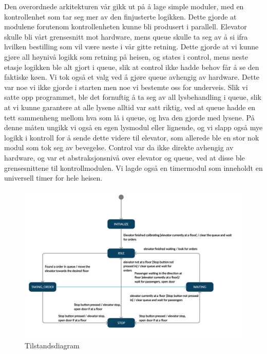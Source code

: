 \documentclass{article}
\begin{document}
Den overordnede arkitekturen vår gikk ut på å lage simple moduler, med en kontrollenhet som tar seg mer av den finjusterte logikken. Dette gjorde at modulene forutenom kontrollenheten kunne bli produsert i parallell. Elevator skulle bli vårt grensesnitt mot hardware, mens queue skulle ta seg av å si ifra hvilken bestilling som vil være neste i vår gitte retning. Dette gjorde at vi kunne gjøre all høynivå logikk som retning på heisen, og states i control, mens neste etasje logikken ble alt gjort i queue, slik at control ikke hadde behov får å se den faktiske køen. Vi tok også et valg ved å gjøre queue avhengig av hardware. Dette var noe vi ikke gjorde i starten men noe vi bestemte oss for underveis. Slik vi satte opp programmet, ble det fornuftig å ta seg av all lysbehandling i queue, slik at vi kunne garantere at alle lysene alltid var satt riktig, ved at queue hadde en tett sammenheng mellom hva som lå i queue, og hva den gjorde med lysene. På denne måten ungikk vi også en egen lysmodul eller lignende, og vi slapp også mye logikk i kontroll for å sende dette videre til elevator, som allerede ble en stor nok modul som tok seg av bevegelse. Control var da ikke direkte avhengig av hardware, og var et abstraksjonsnivå over elevator og queue, ved at disse ble grensesnittene til kontrollmodulen. Vi lagde også en timermodul som inneholdt en universell timer for hele heisen.

\begin{figure}[h!]
  \centering
  \advance\leftskip-0.6cm
  \includegraphics[width=450]{rapport/State_elevator_diagram.png}
  \caption{Tilstandsdiagram}
  \label{fig:StateDia}
\end{figure}
\end{document}

